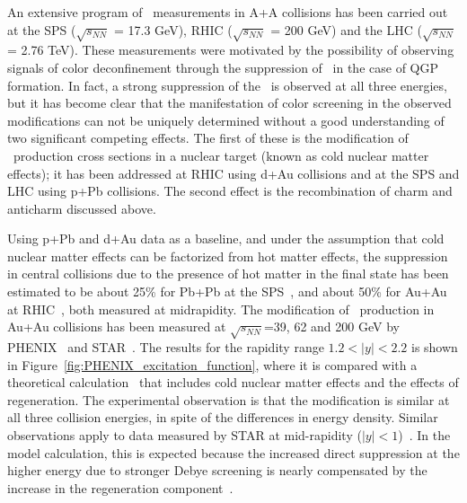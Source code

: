 	
An extensive program of \Jpsi\ measurements in A+A collisions has been carried out at the SPS
($\sqrt{s_{NN}}$ = 17.3 GeV), RHIC ($\sqrt{s_{NN}}$ = 200 GeV) and the LHC ($\sqrt{s_{NN}}$ = 2.76 TeV).
These measurements were motivated by the possibility of observing signals of color deconfinement through the
suppression of \Jpsi\ in the case of QGP formation\cite{Matsui:1986dk}. In fact, a strong suppression of the \Jpsi\ is observed
at all three energies, but it has become clear that the manifestation of color screening in the observed
modifications can not be uniquely determined without a good understanding of two significant competing effects.
The first of these is the modification of \Jpsi\ production cross sections in a nuclear target (known as
cold nuclear matter effects); it has been addressed at RHIC using d+Au collisions and at the SPS and LHC
using p+Pb collisions. The second effect is the recombination of charm and anticharm discussed above.

	
Using p+Pb and d+Au data as a baseline, and under the assumption that cold nuclear matter effects
can be factorized from hot matter effects, the suppression in central collisions due to the presence of
hot matter in the final state has been estimated to be about 25\% for Pb+Pb at the SPS~\cite{Arnaldi:2010ky},
and about 50\% for Au+Au at RHIC~\cite{Brambilla:2010cs}, both measured at midrapidity. The modification
of \Jpsi\ production in Au+Au collisions has been measured at $\sqrt{s_{NN}}$=39, 62 and 200 GeV 
by PHENIX~\cite{Adare:2012wf}
and STAR~\cite{Adamczyk:2013tvk,Zha:2014nia}.
The results for the rapidity range $1.2 < |y| < 2.2 $ is shown in Figure~\ref{fig:PHENIX_excitation_function}, 
where it is compared with a theoretical
calculation~\cite{Zhao:2010nk} that includes cold nuclear matter effects and the effects of regeneration.
The experimental observation is that the modification is similar at all three collision energies, in spite of the
differences in energy density.
Similar observations apply to data measured by STAR at mid-rapidity ($|y| < 1$)~\cite{Adamczyk:2013tvk,Zha:2014nia}.
In the model calculation, this is expected because the increased direct suppression at the 
higher energy due to stronger Debye screening is nearly compensated by the increase in the regeneration 
component~\cite{Grandchamp:2001pf}.
	
